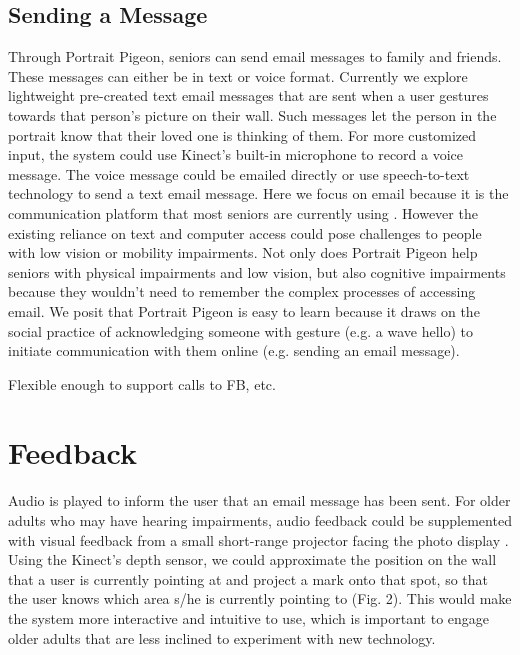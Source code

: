 \documentclass{chi-ext}
\begin{document}
\subsection{Sending a Message}
Through Portrait Pigeon, seniors can send email messages to family and friends. These messages can either be in text or voice format. Currently we explore lightweight pre-created text email messages that are sent when a user gestures towards that person's picture on their wall. Such messages let the person in the portrait know that their loved one is thinking of them. For more customized input, the system could use Kinect's built-in microphone to record a voice message. The voice message could be emailed directly or use speech-to-text technology to send a text email message. Here we focus on email because it is the communication platform that most seniors are currently using \cite{Pew2012}. However the existing reliance on text and computer access could pose challenges to people with low vision or mobility impairments. Not only does Portrait Pigeon help seniors with physical impairments and low vision, but also cognitive impairments because they wouldn't need to remember the complex processes of accessing email. We posit that Portrait Pigeon is easy to learn because it draws on the social practice of acknowledging someone with gesture (e.g. a wave hello) to initiate communication with them online (e.g. sending an email message).

Flexible enough to support calls to FB, etc. 


\section{Feedback}
Audio is played to inform the user that an email message has been sent. For older adults who may have hearing impairments, audio feedback could be supplemented with visual feedback from a small short-range projector facing the photo display \cite{Wilson2010}. Using the Kinect's depth sensor, we could approximate the position on the wall that a user is currently pointing at and project a mark onto that spot, so that the user knows which area s/he is currently pointing to (Fig. 2). This would make the system more interactive and intuitive to use, which is important to engage older adults that are less inclined to experiment with new technology.
\end{document}

